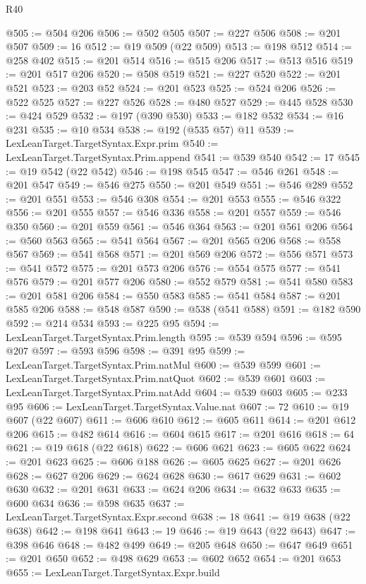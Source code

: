 \begin{lexlean}{R40}
\begin{coremodule}
@505 := @504 @206
@506 := @502 @505
@507 := @227 @506
@508 := @201 @507
@509 := 16
@512 := @19 @509 (@22 @509)
@513 := @198 @512
@514 := @258 @402
@515 := @201 @514
@516 := @515 @206
@517 := @513 @516
@519 := @201 @517 @206
@520 := @508 @519
@521 := @227 @520
@522 := @201 @521
@523 := @203 @52
@524 := @201 @523
@525 := @524 @206
@526 := @522 @525
@527 := @227 @526
@528 := @480 @527
@529 := @445 @528
@530 := @424 @529
@532 := @197 (@390 @530)
@533 := @182 @532
@534 := @16 @231
@535 := @10 @534
@538 := @192 (@535 @57) @11
@539 := LexLeanTarget.TargetSyntax.Expr.prim
@540 := LexLeanTarget.TargetSyntax.Prim.append
@541 := @539 @540
@542 := 17
@545 := @19 @542 (@22 @542)
@546 := @198 @545
@547 := @546 @261
@548 := @201 @547
@549 := @546 @275
@550 := @201 @549
@551 := @546 @289
@552 := @201 @551
@553 := @546 @308
@554 := @201 @553
@555 := @546 @322
@556 := @201 @555
@557 := @546 @336
@558 := @201 @557
@559 := @546 @350
@560 := @201 @559
@561 := @546 @364
@563 := @201 @561 @206
@564 := @560 @563
@565 := @541 @564
@567 := @201 @565 @206
@568 := @558 @567
@569 := @541 @568
@571 := @201 @569 @206
@572 := @556 @571
@573 := @541 @572
@575 := @201 @573 @206
@576 := @554 @575
@577 := @541 @576
@579 := @201 @577 @206
@580 := @552 @579
@581 := @541 @580
@583 := @201 @581 @206
@584 := @550 @583
@585 := @541 @584
@587 := @201 @585 @206
@588 := @548 @587
@590 := @538 (@541 @588)
@591 := @182 @590
@592 := @214 @534
@593 := @225 @95
@594 := LexLeanTarget.TargetSyntax.Prim.length
@595 := @539 @594
@596 := @595 @207
@597 := @593 @596
@598 := @391 @95
@599 := LexLeanTarget.TargetSyntax.Prim.natMul
@600 := @539 @599
@601 := LexLeanTarget.TargetSyntax.Prim.natQuot
@602 := @539 @601
@603 := LexLeanTarget.TargetSyntax.Prim.natAdd
@604 := @539 @603
@605 := @233 @95
@606 := LexLeanTarget.TargetSyntax.Value.nat
@607 := 72
@610 := @19 @607 (@22 @607)
@611 := @606 @610
@612 := @605 @611
@614 := @201 @612 @206
@615 := @482 @614
@616 := @604 @615
@617 := @201 @616
@618 := 64
@621 := @19 @618 (@22 @618)
@622 := @606 @621
@623 := @605 @622
@624 := @201 @623
@625 := @606 @188
@626 := @605 @625
@627 := @201 @626
@628 := @627 @206
@629 := @624 @628
@630 := @617 @629
@631 := @602 @630
@632 := @201 @631
@633 := @624 @206
@634 := @632 @633
@635 := @600 @634
@636 := @598 @635
@637 := LexLeanTarget.TargetSyntax.Expr.second
@638 := 18
@641 := @19 @638 (@22 @638)
@642 := @198 @641
@643 := 19
@646 := @19 @643 (@22 @643)
@647 := @398 @646
@648 := @482 @499
@649 := @205 @648
@650 := @647 @649
@651 := @201 @650
@652 := @498 @629
@653 := @602 @652
@654 := @201 @653
@655 := LexLeanTarget.TargetSyntax.Expr.build

\end{coremodule}
\end{lexlean}
